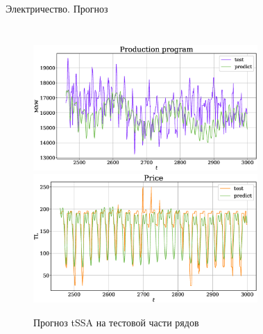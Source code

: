 	\begin{frame}{Электричество. Прогноз}
		
		\begin{columns}
			
			
			\begin{figure}[h]
				\centering
				
				\includegraphics[width=\textwidth, keepaspectratio]{img/electricity/tssa/prediction/Production_program.eps} 
				\includegraphics[width=\textwidth, keepaspectratio]{img/electricity/tssa/prediction/Price.eps}    
				\caption{Прогноз tSSA на тестовой части рядов}
				
			\end{figure}
			
			
			\begin{figure}[h]
				\centering
				

\end{figure}
\end{columns}
\end{frame}
